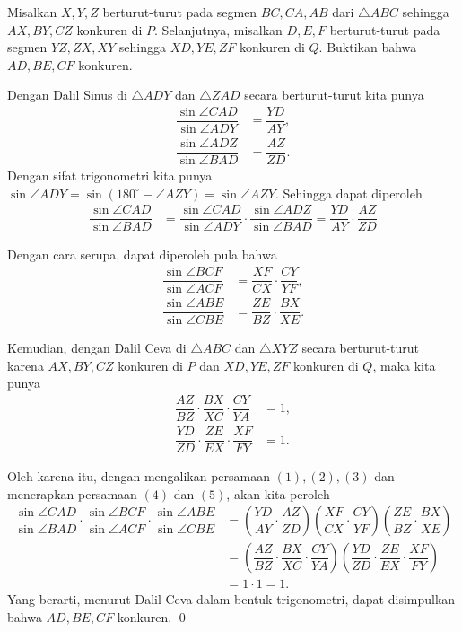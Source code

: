 \documentclass[11pt]{scrartcl}
\begin{document}
	\begin{soalbaru}
		Misalkan $X,Y,Z$ berturut-turut pada segmen $BC,CA,AB$ dari $\triangle ABC$ sehingga $AX, BY, CZ$ konkuren di $P$. Selanjutnya, misalkan $D,E,F$ berturut-turut pada segmen $YZ,ZX,XY$ sehingga $XD,YE,ZF$ konkuren di $Q$. Buktikan bahwa $AD,BE,CF$ konkuren.\\[-10pt]
		
		\begin{solusi}
			Dengan Dalil Sinus di $\triangle ADY$ dan $\triangle ZAD$ secara berturut-turut kita punya
			\begin{align*}
			\dfrac{\sin \angle CAD}{\sin \angle ADY}&=\dfrac{YD}{AY},\\[3.5pt]
			\dfrac{\sin \angle ADZ}{\sin \angle BAD}&=\dfrac{AZ}{ZD}.
			\end{align*}
			Dengan sifat trigonometri kita punya $\sin \angle ADY = \sin (180^\circ-\angle AZY) = \sin \angle AZY$. Sehingga dapat diperoleh 
			\begin{align}
			\dfrac{\sin \angle CAD}{\sin \angle BAD}&=\dfrac{\sin \angle CAD}{\sin \angle ADY}\cdot \dfrac{\sin \angle ADZ}{\sin \angle BAD}=\dfrac{YD}{AY}\cdot\dfrac{AZ}{ZD}
			\end{align}
			
			Dengan cara serupa, dapat diperoleh pula bahwa 
			\begin{align}
			\dfrac{\sin \angle BCF}{\sin \angle ACF}&=\dfrac{XF}{CX}\cdot\dfrac{CY}{YF},\\[3.5pt]
			\dfrac{\sin \angle ABE}{\sin \angle CBE}&=\dfrac{ZE}{BZ}\cdot\dfrac{BX}{XE}.
			\end{align}
			
			Kemudian, dengan Dalil Ceva di $\triangle ABC$ dan $\triangle XYZ$ secara berturut-turut karena $AX, BY, CZ$ konkuren di $P$ dan $XD,YE,ZF$ konkuren di $Q$, maka kita punya
			\begin{align}
			\dfrac{AZ}{BZ}\cdot\dfrac{BX}{XC}\cdot\dfrac{CY}{YA}&=1,\\[3.5pt]
			\dfrac{YD}{ZD}\cdot\dfrac{ZE}{EX}\cdot\dfrac{XF}{FY}&=1.
			\end{align}
			
			Oleh karena itu, dengan mengalikan persamaan $(1),(2),(3)$ dan menerapkan persamaan $(4)$ dan $(5)$, akan kita peroleh 
			\begin{align*}
			\dfrac{\sin \angle CAD}{\sin \angle BAD}\cdot\dfrac{\sin \angle BCF}{\sin \angle ACF}\cdot\dfrac{\sin \angle ABE}{\sin \angle CBE}&=\left(\dfrac{YD}{AY}\cdot\dfrac{AZ}{ZD}\right)\left(\dfrac{XF}{CX}\cdot\dfrac{CY}{YF}\right)\left(\dfrac{ZE}{BZ}\cdot\dfrac{BX}{XE}\right)\\[3.5pt]
			&=\left(\dfrac{AZ}{BZ}\cdot\dfrac{BX}{XC}\cdot\dfrac{CY}{YA}\right)\left(\dfrac{YD}{ZD}\cdot\dfrac{ZE}{EX}\cdot\dfrac{XF}{FY}\right)\\[3.5pt] &= 1 \cdot 1 = 1.
			\end{align*}
			Yang berarti, menurut Dalil Ceva dalam bentuk trigonometri, dapat disimpulkan bahwa $AD,BE,CF$ konkuren. \qed
		\end{solusi}
	\end{soalbaru}
	
\end{document}
